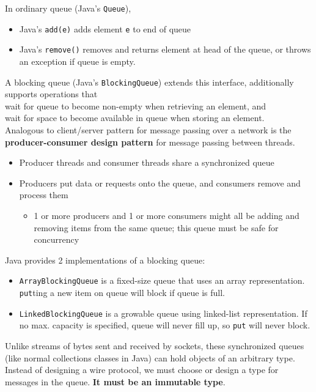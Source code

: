 \documentclass[10pt]{amsart}
\begin{document}
\begin{multicols*}{2}
In ordinary queue (Java's \texttt{Queue}), \\
\begin{itemize}
	\item Java's \texttt{add(e)} adds element \texttt{e} to end of queue
	\item Java's \texttt{remove()} removes and returns element at head of the queue, or throws an exception if queue is empty.
\end{itemize}

A blocking queue (Java's \verb|BlockingQueue|) extends this interface, additionally supports operations that \\
wait for queue to become non-empty when retrieving an element, and \\
wait for space to become available in queue when storing an element. \\

Analogous to client/server pattern for message passing over a network is the \textbf{producer-consumer design pattern} for message passing between threads. 
\begin{itemize} 
\item Producer threads and consumer threads share a synchronized queue
\item Producers put data or requests onto the queue, and consumers remove and process them
\begin{itemize}
	\item 1 or more producers and 1 or more consumers might all be adding and removing items from the same queue; this queue must be safe for concurrency
\end{itemize}
\end{itemize} 

Java provides 2 implementations of a blocking queue:
\begin{itemize}
	\item \verb|ArrayBlockingQueue| is a fixed-size queue that uses an array representation. \verb|put|ting a new item on queue will block if queue is full.
	\item \verb|LinkedBlockingQueue| is a growable queue using linked-list representation. If no max. capacity is specified, queue will never fill up, so \verb|put| will never block.
\end{itemize}

Unlike streams of bytes sent and received by sockets, these synchronized queues (like normal collections classes in Java) can hold objects of an arbitrary type. Instead of designing a wire protocol, we must choose or design a type for messages in the queue. \textbf{It must be an immutable type}. 



\end{multicols*}
\end{document}
